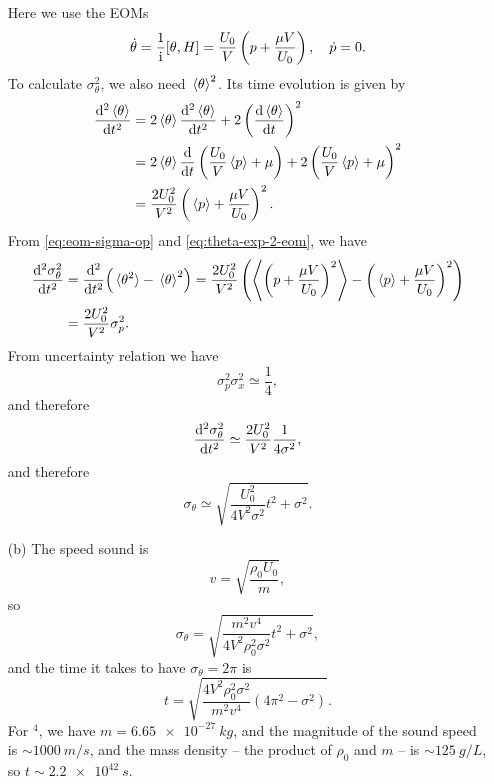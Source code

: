 \documentclass[hyperref, a4paper]{article}
\newcommand*{\ii}{\mathrm{i}}
\begin{document}
\begin{itemize}
Here we use the EOMs 
\begin{equation}
    \dot{\theta} = \frac{1}{\ii} \comm{\theta}{H} = \frac{U_0}{V} \left( p + \frac{\mu V}{U_0} \right),
    \quad \dot{p} = 0.
\end{equation}
To calculate $\sigma_\theta^2$, we also need $\expval*{\theta}^2$. Its time evolution is given by 
\begin{equation}
    \begin{aligned}
        \dv[2]{\expval*{\theta}}{t} &= 2 \expval*{\theta} \dv[2]{\expval*{\theta}}{t} 
       + 2 \left( \dv{\expval*{\theta}}{t} \right)^2  \\
       &= 2 \expval*{\theta} \dv{t} \left(  \frac{U_0}{V} \expval*{p} + \mu \right)
       + 2 \left(  \frac{U_0}{V} \expval*{p} + \mu \right)^2 \\
       &= \frac{2 U_0^2}{V^2} \left( \expval*{p} + \frac{\mu V}{U_0} \right)^2 .
    \end{aligned}
    \label{eq:theta-exp-2-eom}
\end{equation}
From \eqref{eq:eom-sigma-op} and \eqref{eq:theta-exp-2-eom}, we have 
\begin{equation}
    \begin{aligned}
        \dv[2]{\sigma_\theta^2}{t} &= 
        \dv[2]{t} (\expval*{\theta^2} - \expval*{\theta}^2) 
        = \frac{2 U_0^2}{V^2} \left( 
            \expval{\left( p + \frac{\mu V}{U_0} \right)^2} 
            - \left( \expval*{p} + \frac{\mu V}{U_0} \right)^2 
        \right)  \\
        &= \frac{2 U_0^2}{V^2} \sigma_p^2.
    \end{aligned}
\end{equation}
From uncertainty relation we have 
\begin{equation}
    \sigma_p^2 \sigma_x^2 \simeq \frac{1}{4},
\end{equation}
and therefore 
\begin{equation}
    \dv[2]{\sigma_\theta^2}{t} \simeq \frac{2 U_0^2}{V^2} \frac{1}{4 \sigma^2},
\end{equation}
and therefore 
\begin{equation}
    \sigma_\theta \simeq \sqrt{ \frac{ U_0^2}{4 V^2 \sigma^2} t^2 + \sigma^2 }.
\end{equation}

\item[(b)] The speed sound is 
\begin{equation}
    v = \sqrt{\frac{\rho_0 U_0}{m}},
\end{equation}
so 
\begin{equation}
    \sigma_\theta  = \sqrt{ \frac{m^2 v^4}{4 V^2 \rho_0^2 \sigma^2} t^2 + \sigma^2 },
\end{equation}
and the time it takes to have $\sigma_\theta = 2 \pi$ is 
\begin{equation}
    t = \sqrt{ \frac{4 V^2 \rho_0^2 \sigma^2}{m^2 v^4} (4\pi^2 - \sigma^2 )}.
\end{equation} 
For $^4$, we have $m = \SI{6.65e-27}{kg}$,
and the magnitude of the sound speed is $\sim \SI{1000}{m/s}$,
and the mass density -- the product of $\rho_0$ and $m$ -- is $\sim \SI{125}{g/L}$,
so $t \sim \SI{2.2e42}{s}$.


\end{itemize}
\end{document}
